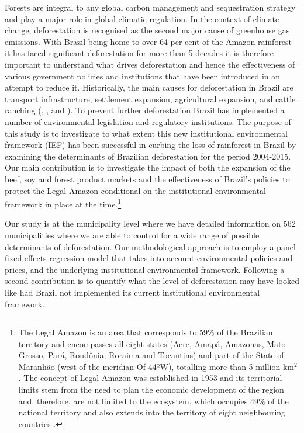 Forests are integral to any global carbon management and sequestration strategy and play a major role in global climatic regulation. In the context of climate change, deforestation is recognised as the second major cause of greenhouse gas emissions. With Brazil being home to over 64 per cent of the Amazon rainforest it has faced significant deforestation for more than 5 decades it is therefore important to understand what drives deforestation and hence the effectiveness of various government policies and institutions that have been introduced in an attempt to reduce it. Historically, the main causes for deforestation in Brazil are transport infrastructure, settlement expansion, agricultural expansion, and cattle ranching (\citet{GEIST2}, \citet{PFAFF3}, \citet{NEPSTAD} and \citet{RICHARDS}). To prevent further deforestation Brazil has implemented a number of environmental legislation and regulatory institutions. The purpose of this study is to investigate to what extent this new institutional environmental framework (IEF) has been successful in curbing the loss of rainforest in Brazil by examining the determinants of Brazilian deforestation for the period 2004-2015. Our main contribution is to investigate the impact of both the expansion of the beef, soy and forest product markets and the effectiveness of Brazil's policies to protect the Legal Amazon conditional on the institutional environmental framework in place at the time.\footnote{The Legal Amazon is an area that corresponds to 59$\%$ of the Brazilian territory and encompasses all eight states (Acre, Amapá, Amazonas, Mato Grosso, Pará, Rondônia, Roraima and Tocantins) and part of the State of Maranhão (west of the meridian Of 44ºW), totalling more than 5 million km$^{2}$. The concept of Legal Amazon was established in 1953 and its territorial limits stem from the need to plan the economic development of the region and, therefore, are not limited to the ecosystem, which occupies 49$\%$ of the national territory and also extends into the territory of eight neighbouring countries \citep{IPEAwebsite}.} 

Our study is at the municipality level where we have detailed information on 562 municipalities where we are able to control for a wide range of possible determinants of deforestation. Our methodological approach is to employ a panel fixed effects regression model that takes into account environmental policies and prices, and the underlying institutional environmental framework. Following \citet{assuncao2015} a second contribution is to quantify what the level of deforestation may have looked like had Brazil not implemented its current institutional environmental framework.

